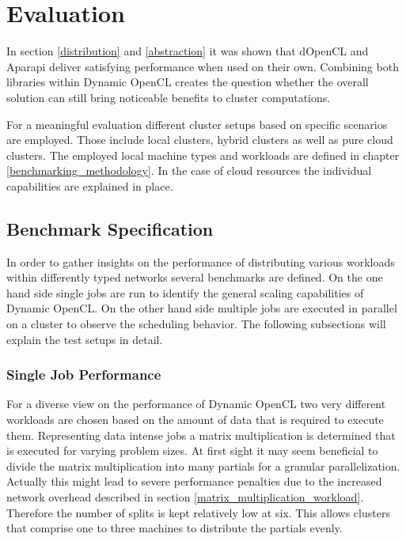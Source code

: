\chapter{Evaluation}

In section \ref{distribution} and \ref{abstraction} it was shown that dOpenCL and Aparapi deliver satisfying performance when used on their own. Combining both libraries within Dynamic OpenCL creates the question whether the overall solution can still bring noticeable benefits to cluster computations.

For a meaningful evaluation different cluster setups based on specific scenarios are employed. Those include local clusters, hybrid clusters as well as pure cloud clusters. The employed local machine types and workloads are defined in chapter \ref{benchmarking_methodology}. In the case of cloud resources the individual capabilities are explained in place.

\section{Benchmark Specification}

In order to gather insights on the performance of distributing various workloads within differently typed networks several benchmarks are defined. On the one hand side single jobs are run to identify the general scaling capabilities of Dynamic OpenCL. On the other hand side multiple jobs are executed in parallel on a cluster to observe the scheduling behavior. The following subsections will explain the test setups in detail.

\subsection{Single Job Performance}

For a diverse view on the performance of Dynamic OpenCL two very different workloads are chosen based on the amount of data that is required to execute them. Representing data intense jobs a matrix multiplication is determined that is executed for varying problem sizes. At first sight it may seem beneficial to divide the matrix multiplication into many partials for a granular parallelization. Actually this might lead to severe performance penalties due to the increased network overhead described in section \ref{matrix_multiplication_workload}. Therefore the number of splits is kept relatively low at six. This allows clusters that comprise one to three machines to distribute the partials evenly.

